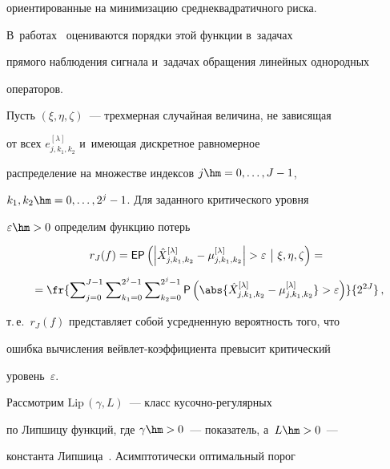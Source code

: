 ориентированные на минимизацию среднеквадратичного риска. 


В~работах~\cite{KS16, KS18} оцениваются порядки этой функции в~задачах 


прямого наблюдения сигнала и~задачах обращения линейных однородных 


операторов.





Пусть $(\xi,\eta,\zeta)$~--- трехмерная случайная величина, не зависящая 


от всех $ e_{j,k_1,k_2}^{[\lambda]}$ и~име\-ющая дискретное равномерное 


распределение на множестве индексов $j\hm=0,\ldots,J-1$, 


$k_1,k_2\hm=0,\ldots,2^j-1$. Для заданного критического уровня  


$\varepsilon\hm>0$ определим функцию потерь


\begin{multline*}


r_J(f)={\sf E}{\sf P}\left(\left|\hat{X}_{j,k_1,k_2}^{[\lambda]} - 


\mu_{j,k_1,k_2}^{[\lambda]}\right|>\varepsilon\ \big|\ 


\xi,\eta,\zeta\right)={}\\[6pt]


{}=


\fr{\sum\nolimits_{j=0}^{J-1}\sum\nolimits_{k_1=0}^{2^j-


1}\sum\nolimits_{k_2=0}^{2^j-1} {\sf 


P}\left(\abs{\hat{X}_{j,k_1,k_2}^{[\lambda]} - 


\mu_{j,k_1,k_2}^{[\lambda]}}>\varepsilon\right)}{2^{2J}}\,,


\end{multline*}


т.\,е.~$r_J(f)$ представляет собой усредненную вероятность того, что 


ошибка вы\-чис\-ле\-ния вейв\-лет-ко\-эф\-фи\-ци\-ен\-та превысит критический 


уровень~$\varepsilon$.





Рассмотрим $\mathrm{Lip}\,(\gamma,L)$~--- класс ку\-соч\-но-ре\-гу\-ляр\-ных 


по Липшицу функций, где $\gamma\hm>0$~--- показатель, а~$L\hm>0$~--- 


константа Липшица~\cite{Mal99}. Асимптотически оптимальный порог 


